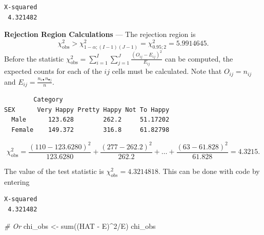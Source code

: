 \documentclass[
]{article}
\newenvironment{Shaded}{\begin{snugshade}}{\end{snugshade}}
\newcommand{\CommentTok}[1]{\textcolor[rgb]{0.56,0.35,0.01}{\textit{#1}}}
\newcommand{\DecValTok}[1]{\textcolor[rgb]{0.00,0.00,0.81}{#1}}
\newcommand{\FunctionTok}[1]{\textcolor[rgb]{0.00,0.00,0.00}{#1}}
\newcommand{\NormalTok}[1]{#1}
\newcommand{\OtherTok}[1]{\textcolor[rgb]{0.56,0.35,0.01}{#1}}
\newcommand{\SpecialCharTok}[1]{\textcolor[rgb]{0.00,0.00,0.00}{#1}}
\begin{document}
\begin{verbatim}
X-squared 
 4.321482 
\end{verbatim}

\textbf{Rejection Region Calculations} --- The rejection region is \[\chi_{\text{obs}}^2 > \chi^2_{1-\alpha; (I-1)(J-1)}=\chi^2_{0.95;2}= 5.9914645.\] Before the statistic \(\chi^2_{\text{obs}}= \sum_{i=1}^I\sum_{j=1}^J \frac{(O_{ij} - E_{ij})^2}{E_{ij}}\) can be computed, the expected counts for each of the \(ij\) cells must be calculated. Note that \(O_{ij}=n_{ij}\) and \(E_{ij}=\frac{n_{i\bullet}n_{\bullet j}}{n}\).

\begin{Shaded}
\end{Shaded}

\begin{verbatim}
        Category
SEX      Very Happy Pretty Happy Not To Happy
  Male      123.628        262.2     51.17202
  Female    149.372        316.8     61.82798
\end{verbatim}

\[\chi^2_{\text{obs}}=\frac{(110 - 123.6280)^2}{123.6280} +
\frac{(277-262.2)^2}{262.2}+ \dots +\frac{(63-61.828)^2}{61.828}=4.3215.\]

The value of the test statistic is \(\chi^2_{obs}= 4.3214818\).
This can be done with code by entering

\begin{Shaded}
\end{Shaded}

\begin{verbatim}
X-squared 
 4.321482 
\end{verbatim}

\begin{Shaded}
\begin{Highlighting}[]
\CommentTok{\# Or}
\NormalTok{chi\_obs }\OtherTok{\textless{}{-}} \FunctionTok{sum}\NormalTok{((HAT }\SpecialCharTok{{-}}\NormalTok{ E)}\SpecialCharTok{\^{}}\DecValTok{2}\SpecialCharTok{/}\NormalTok{E)}
\NormalTok{chi\_obs}
\end{Highlighting}
\end{Shaded}
\end{document}

